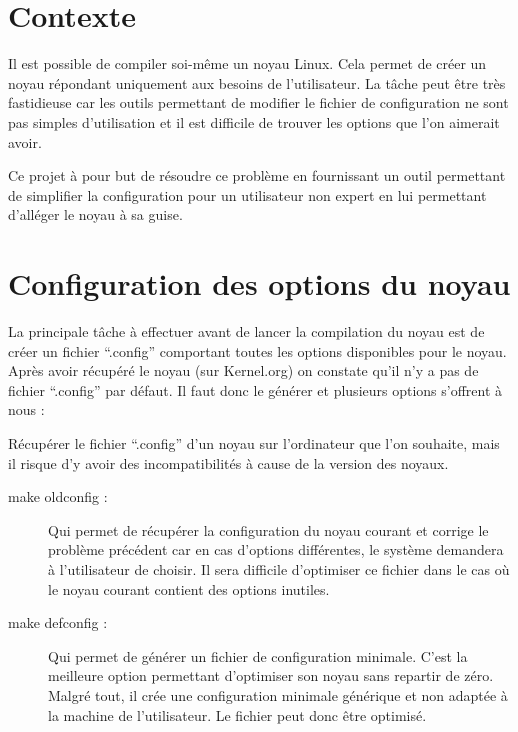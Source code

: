 \documentclass[16pts]{report}
\begin{document}

\nocite{*}

\chapter{Contexte}
Il est possible de compiler soi-même un noyau Linux. Cela permet de créer
    un noyau répondant uniquement aux besoins de l’utilisateur. La tâche peut
    être très fastidieuse car les outils permettant de modifier le fichier
    de configuration ne sont pas simples d’utilisation et il est difficile
    de trouver les options que l’on aimerait avoir.

Ce projet à pour but de résoudre ce problème en fournissant un outil permettant
    de simplifier la configuration pour un utilisateur non expert en
    lui permettant d’alléger le noyau à sa guise.

\chapter{Configuration des options du noyau}
La principale tâche à effectuer avant de lancer la compilation du noyau est
    de créer un fichier “.config” comportant toutes les options disponibles
    pour le noyau.  Après avoir récupéré le noyau (sur Kernel.org) on constate
    qu’il n’y a pas de fichier “.config” par défaut. Il faut donc le générer et
    plusieurs options s’offrent à nous :

Récupérer le fichier “.config” d’un noyau sur l’ordinateur que l’on souhaite,
    mais il risque d’y avoir des incompatibilités à cause de la version
    des noyaux.

\begin{description}
    \item[make oldconfig :] Qui permet de récupérer la configuration du noyau
        courant et corrige le problème précédent car en cas d’options
        différentes, le système demandera à l’utilisateur de choisir. Il sera
        difficile d’optimiser ce fichier dans le cas où le noyau courant
        contient des options inutiles.

    \item[make defconfig :] Qui permet de générer un fichier de configuration
        minimale.  C’est la meilleure option permettant d’optimiser son noyau
        sans repartir de zéro.  Malgré tout, il crée une configuration minimale
        générique et non adaptée à la machine de l’utilisateur.
        Le fichier peut donc être optimisé.
\end{description}
\end{document}
